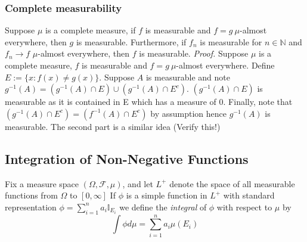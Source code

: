 \documentclass{article}
\begin{document}
\subsubsection{Complete measurability}
Suppose $\mu$ is a complete measure, if $f$ is measurable and $f=g  \ \mu$-almost everywhere, then $g$ is measurable. Furthermore, if $f_n$ is measurable for $n \in \mathbb{N}$ and $f_n\to f$ $\mu$-almost everywhere, then $f$ is measurable. \newline \newline
\textit{Proof.}\newline \newline
Suppose  $\mu$ is a complete measure, $f$ is measurable and $f=g  \ \mu$-almost everywhere. Define $E:=\{x:f(x)\neq g(x)\}$. Suppose $A$ is measurable and note $g^{-1}(A) = (g^{-1}(A)\cap E) \cup (g^{-1}(A)\cap E^c)$. $(g^{-1}(A)\cap E)$ is measurable as it is contained in E which has a measure of 0. Finally, note that $(g^{-1}(A)\cap E^c)=(f^{-1}(A)\cap E^c)$ by assumption hence $g^{-1}(A)$ is measurable. \newline \newline
The second part is a similar idea (Verify this!)

\subsection{Integration of Non-Negative Functions}
Fix a measure space $(\Omega, \mathcal{F}, \mu)$, and let $L^+$ denote the space of all measurable functions from $\Omega$ to  $[0,\infty]$ If $\phi$ is a simple function in $L^+$ with standard representation $\phi = \sum_{i=1}^na_i\mathbb{I}_{E_i}$ we define the \emph{integral} of $\phi$ with respect to $\mu$ by 
\[
\int\phi d\mu= \sum_{i=1}^na_i\mu(E_i)
\]
\end{document}

